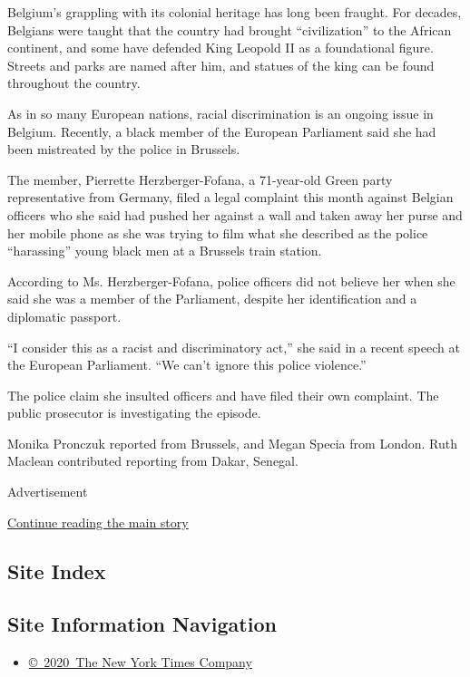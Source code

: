 Belgium's grappling with its colonial heritage has long been fraught.
For decades, Belgians were taught that the country had brought
``civilization'' to the African continent, and some have defended King
Leopold II as a foundational figure. Streets and parks are named after
him, and statues of the king can be found throughout the country.

As in so many European nations, racial discrimination is an ongoing
issue in Belgium. Recently, a black member of the European Parliament
said she had been mistreated by the police in Brussels.

The member, Pierrette Herzberger-Fofana, a 71-year-old Green party
representative from Germany, filed a legal complaint this month against
Belgian officers who she said had pushed her against a wall and taken
away her purse and her mobile phone as she was trying to film what she
described as the police ``harassing'' young black men at a Brussels
train station.

According to Ms. Herzberger-Fofana, police officers did not believe her
when she said she was a member of the Parliament, despite her
identification and a diplomatic passport.

``I consider this as a racist and discriminatory act,'' she said in a
recent speech at the European Parliament. ``We can't ignore this police
violence.''

The police claim she insulted officers and have filed their own
complaint. The public prosecutor is investigating the episode.

Monika Pronczuk reported from Brussels, and Megan Specia from London.
Ruth Maclean contributed reporting from Dakar, Senegal.

Advertisement

\protect\hyperlink{after-bottom}{Continue reading the main story}

\hypertarget{site-index}{%
\subsection{Site Index}\label{site-index}}

\hypertarget{site-information-navigation}{%
\subsection{Site Information
Navigation}\label{site-information-navigation}}

\begin{itemize}
\tightlist
\item
  \href{https://help.nytimes.com/hc/en-us/articles/115014792127-Copyright-notice}{©~2020~The
  New York Times Company}
\end{itemize}

